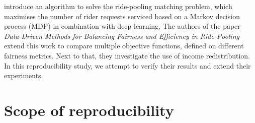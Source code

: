 \citet{shah20} introduce an algorithm to solve the ride-pooling matching problem, which maximises the number of rider requests serviced based on a Markov decision process (MDP) in combination with deep learning. The authors of the paper \textit{Data-Driven Methods for Balancing Fairness and Efficiency in Ride-Pooling} \cite{raman21} extend this work to compare multiple objective functions, defined on different fairness metrics. Next to that, they investigate the use of income redistribution. In this reproducibility study, we attempt to verify their results and extend their experiments.







\section{Scope of reproducibility}
\label{sec:Scope of reproducibility}

